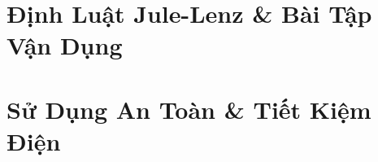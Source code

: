 \documentclass{article}
\begin{document}

\section{Định Luật Jule-Lenz \& Bài Tập Vận Dụng}


\section{Sử Dụng An Toàn \& Tiết Kiệm Điện}


\printbibliography[heading=bibintoc]
	
\end{document}
